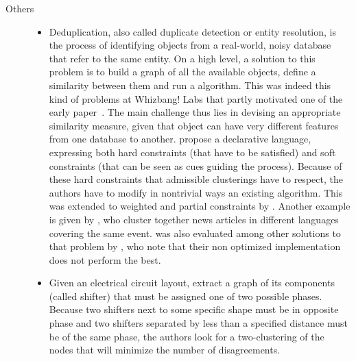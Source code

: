 \begin{description}
   \item[Others]
      \begin{itemize}[leftmargin=*]
	 \item
	    Deduplication, also called duplicate detection or entity resolution, is the process
	    of identifying objects from a real-world, noisy database that refer to the same entity.
	    On a high level, a solution to this problem is to build a graph of all the available
	    objects, define a similarity between them and run a \pcc{} algorithm. This was indeed
	    this kind of problems at Whizbang! Labs that partly motivated one of the early \pcc{}
	    paper~\autocite{Bansal2002}. The main challenge
	    thus lies in devising an appropriate similarity measure, given that object can have very
	    different features from one database to another. \Textcite{LargeScaleDeDup09} propose a
	    declarative language, expressing both hard constraints (that have to be satisfied) and
	    soft constraints (that can be seen as cues guiding the process). Because of these hard
	    constraints that admissible clusterings have to respect, the authors have to modify in
	    nontrivial ways an existing \pcc{} algorithm. This was extended to weighted and partial
	    constraints  by \textcite{WeightedER14}. Another example is given by
	    \textcite{Crosslingual07}, who cluster together news articles in different languages
	    covering the same event. \pcc{} was also evaluated among other
	    solutions to that problem by \textcite{DeDup09}, who note that their non optimized
	    implementation does not perform the best.
	 \item 
	    Given an electrical circuit layout, \textcite{circuitDesign07} extract a graph of its
	    components (called shifter) that must be assigned one of two possible phases. Because
	    two shifters next to some specific shape must be in opposite phase and two shifters
	    separated by less than a specified distance must be of the same phase, the authors look
	    for a two-clustering of the nodes that will minimize the number of disagreements.
      \end{itemize}
\end{description}
